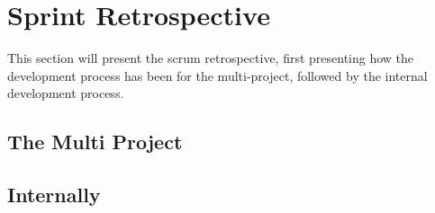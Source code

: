 \section{Sprint Retrospective}

This section will present the scrum retrospective, first presenting how the development process has been for the multi-project, followed by the internal development process.

\subsection*{The Multi Project}



\subsection{Internally}


